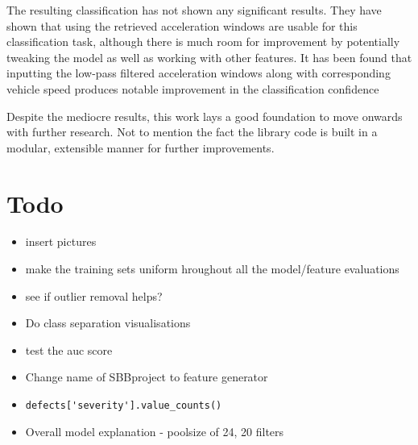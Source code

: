 The resulting classification has not shown any significant results. They have shown that using the retrieved acceleration windows are usable for this classification task, although there is much room for improvement by potentially tweaking the model as well as working with other features. It has been found that inputting the low-pass filtered acceleration windows along with corresponding vehicle speed produces notable improvement in the classification confidence

Despite the mediocre results, this work lays a good foundation to move onwards with further research. Not to mention the fact the library code is built in a modular, extensible manner for further improvements.

\newpage
\section{Todo}
\begin{itemize}
	\item insert pictures
	\item make the training sets uniform hroughout all the model/feature evaluations
	\item see if outlier removal helps?
	\item Do class separation visualisations
	\item test the auc score
	\item Change name of SBBproject to feature generator
	\item \verb|defects['severity'].value_counts()|
	\item Overall model explanation - poolsize of 24, 20 filters
\end{itemize}


\newpage
\cleardoublepage
\appendix

